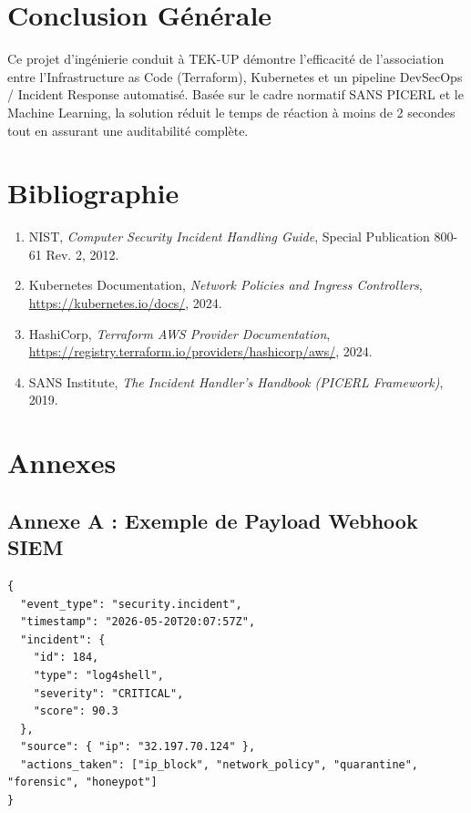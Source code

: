 \documentclass[12pt,a4paper]{report}
\begin{document}
\chapter{Conclusion Générale}
Ce projet d'ingénierie conduit à TEK-UP démontre l'efficacité de l'association entre l'Infrastructure as Code (Terraform), Kubernetes et un pipeline DevSecOps / Incident Response automatisé. Basée sur le cadre normatif SANS PICERL et le Machine Learning, la solution réduit le temps de réaction à moins de 2 secondes tout en assurant une auditabilité complète.

\chapter*{Bibliographie}
\begin{enumerate}
    \item NIST, \textit{Computer Security Incident Handling Guide}, Special Publication 800-61 Rev. 2, 2012.
    \item Kubernetes Documentation, \textit{Network Policies and Ingress Controllers}, \url{https://kubernetes.io/docs/}, 2024.
    \item HashiCorp, \textit{Terraform AWS Provider Documentation}, \url{https://registry.terraform.io/providers/hashicorp/aws/}, 2024.
    \item SANS Institute, \textit{The Incident Handler's Handbook (PICERL Framework)}, 2019.
\end{enumerate}

\chapter*{Annexes}
\section*{Annexe A : Exemple de Payload Webhook SIEM}
\begin{lstlisting}[caption={Format JSON transmis au SIEM / SOAR}]
{
  "event_type": "security.incident",
  "timestamp": "2026-05-20T20:07:57Z",
  "incident": {
    "id": 184,
    "type": "log4shell",
    "severity": "CRITICAL",
    "score": 90.3
  },
  "source": { "ip": "32.197.70.124" },
  "actions_taken": ["ip_block", "network_policy", "quarantine", "forensic", "honeypot"]
}
\end{lstlisting}
\end{document}
